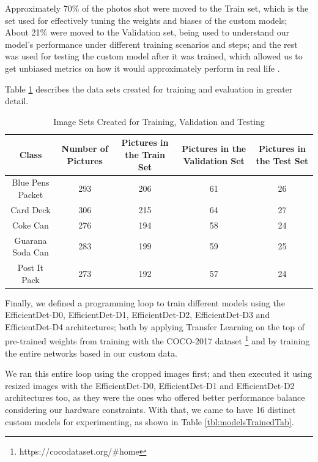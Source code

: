 \documentclass[openright]{normas-utf-tex} %
\begin{document}
Approximately 70\% of the photos shot were moved to the Train set, which is the set used for effectively 
tuning the weights and biases of the custom models; About 21\% were moved to the Validation set, 
being used to understand our model's performance under different training scenarios and steps; 
and the rest was used for testing the custom model after it was trained, which allowed us to 
get unbiased metrics on how it would approximately perform in real life \cite{MluExplain}.

Table \ref{tbl:imageSetsTab} describes the data sets created for training and evaluation in greater detail.

\begin{table}[H]
	\centering
	\begin{adjustbox}{width=1\textwidth}
	\label{tab:imageSets}
	\begin{tabular}{c|c|c|c|c}
		\hline 
		Class & Number of Pictures & Pictures in the Train Set & Pictures in the Validation Set & Pictures in the Test Set \\
		\hline
        Blue Pens Packet & 293 & 206 & 61 & 26\\
		Card Deck & 306 & 215 & 64 & 27\\
		Coke Can & 276 & 194 & 58 & 24\\
		Guarana Soda Can & 283 & 199 & 59 & 25\\
		Post It Pack & 273 & 192 & 57 & 24\\
		\hline 
	\end{tabular}
	\end{adjustbox}
	\caption[Image Sets Created for Training, Validation and Testing]{Image Sets Created for Training, Validation and Testing}
	\label{tbl:imageSetsTab}
\end{table}

Finally, we defined a programming loop to train different models using the EfficientDet-D0,
EfficientDet-D1, EfficientDet-D2, EfficientDet-D3 and EfficientDet-D4 architectures; both by
applying Transfer Learning on the top of pre-trained weights from training with the COCO-2017 dataset 
\footnote{https://cocodataset.org/\#home} and by training the entire networks based in our custom data. 

We ran this entire loop using the cropped images first; and then executed it using resized images with the EfficientDet-D0,
EfficientDet-D1 and EfficientDet-D2 architectures too, as they were the ones who offered better
performance balance considering our hardware constraints. 
With that, we came to have 16 distinct custom models for experimenting, as shown in Table \ref{tbl:modelsTrainedTab}.
\end{document}
